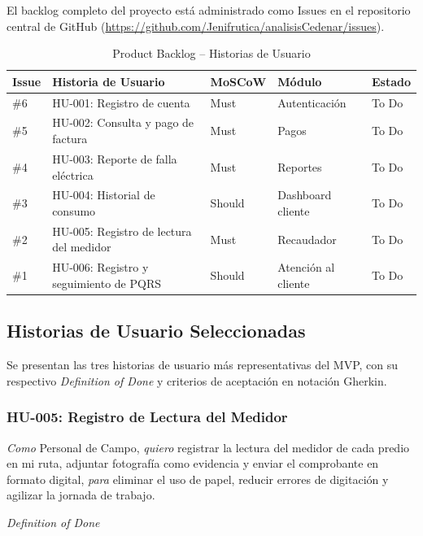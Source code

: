 \documentclass[12pt, a4paper]{article}
\begin{document}
El backlog completo del proyecto está administrado como Issues en el repositorio central de GitHub (\url{https://github.com/Jenifrutica/analisisCedenar/issues}).

\begin{table}[H]
  \caption{Product Backlog -- Historias de Usuario}
  \centering
  \begin{tabular}{p{1.2cm} p{5.5cm} p{2cm} p{2.8cm} p{1.5cm}}
    \toprule
    \textbf{Issue} & \textbf{Historia de Usuario} & \textbf{MoSCoW} & \textbf{Módulo} & \textbf{Estado} \\
    \midrule
    \#6 & HU-001: Registro de cuenta & Must & Autenticación & To Do \\
    \#5 & HU-002: Consulta y pago de factura & Must & Pagos & To Do \\
    \#4 & HU-003: Reporte de falla eléctrica & Must & Reportes & To Do \\
    \#3 & HU-004: Historial de consumo & Should & Dashboard cliente & To Do \\
    \#2 & HU-005: Registro de lectura del medidor & Must & Recaudador & To Do \\
    \#1 & HU-006: Registro y seguimiento de PQRS & Should & Atención al cliente & To Do \\
    \bottomrule
  \end{tabular}
\end{table}

\subsection{Historias de Usuario Seleccionadas}

Se presentan las tres historias de usuario más representativas del MVP, con su respectivo \textit{Definition of Done} y criterios de aceptación en notación Gherkin.

\subsubsection{HU-005: Registro de Lectura del Medidor}

\noindent\textit{Como} Personal de Campo, \textit{quiero} registrar la lectura del medidor de cada predio en mi ruta, adjuntar fotografía como evidencia y enviar el comprobante en formato digital, \textit{para} eliminar el uso de papel, reducir errores de digitación y agilizar la jornada de trabajo.

\vspace{6pt}
\noindent\textit{Definition of Done}
\end{document}
